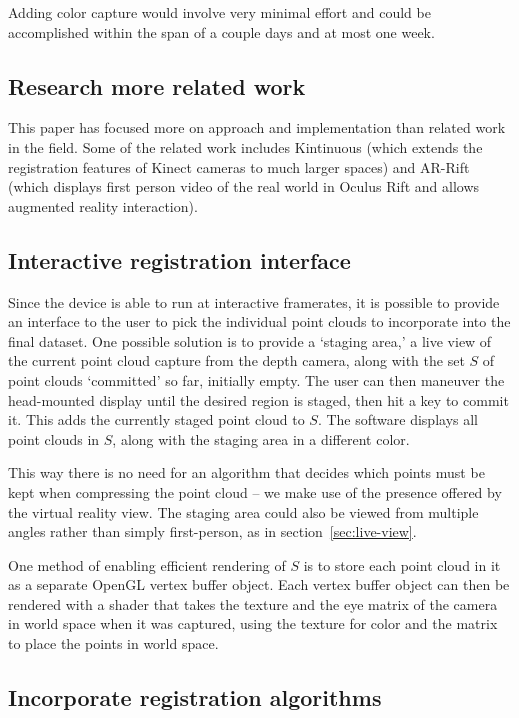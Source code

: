 \documentclass[pageno]{jpaper}
\begin{document}
Adding color capture would involve very minimal effort and could be accomplished
within the span of a couple days and at most one week.

\subsection{Research more related work}

This paper has focused more on approach and implementation than related work in
the field. Some of the related work includes Kintinuous (which extends the
registration features of Kinect cameras to much larger spaces) and AR-Rift
(which displays first person video of the real world in Oculus Rift and allows
augmented reality interaction). 

\subsection{Interactive registration interface}

Since the device is able to run at interactive framerates, it is possible to
provide an interface to the user to pick the individual point clouds to
incorporate into the final dataset. One possible solution is to provide a
`staging area,' a live view of the current point cloud capture from the depth
camera, along with the set $S$ of point clouds `committed' so far, initially
empty. The user can then maneuver the head-mounted display until the desired
region is staged, then hit a key to commit it. This adds the currently staged
point cloud to $S$. The software displays all point clouds in $S$, along with
the staging area in a different color.

This way there is no need for an algorithm that decides which points must be
kept when compressing the point cloud -- we make use of the presence offered by
the virtual reality view. The staging area could also be viewed from multiple
angles rather than simply first-person, as in section~\ref{sec:live-view}.

One method of enabling efficient rendering of $S$ is to store each point cloud
in it as a separate OpenGL vertex buffer object. Each vertex buffer object can
then be rendered with a shader that takes the texture and the eye matrix of the
camera in world space when it was captured, using the texture for color and the
matrix to place the points in world space.

\subsection{Incorporate registration algorithms}
\end{document}
